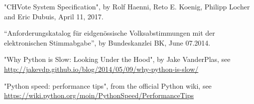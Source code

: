 \begin{thebibliography}{999}
	"CHVote System Specification", by Rolf Haenni, Reto E. Koenig, Philipp Locher and Eric Dubuis, April 11, 2017.
	
	"`Anforderungskatalog für eidgenössische Volksabstimmungen mit der elektronischen Stimmabgabe"', by Bundeskanzlei BK, June 07.2014.

	"Why Python is Slow: Looking Under the Hood", by Jake VanderPlas, see \url{http://jakevdp.github.io/blog/2014/05/09/why-python-is-slow/}

	"Python speed: performance tips", from the official Python wiki, see \url{https://wiki.python.org/moin/PythonSpeed/PerformanceTips}
\end{thebibliography}
